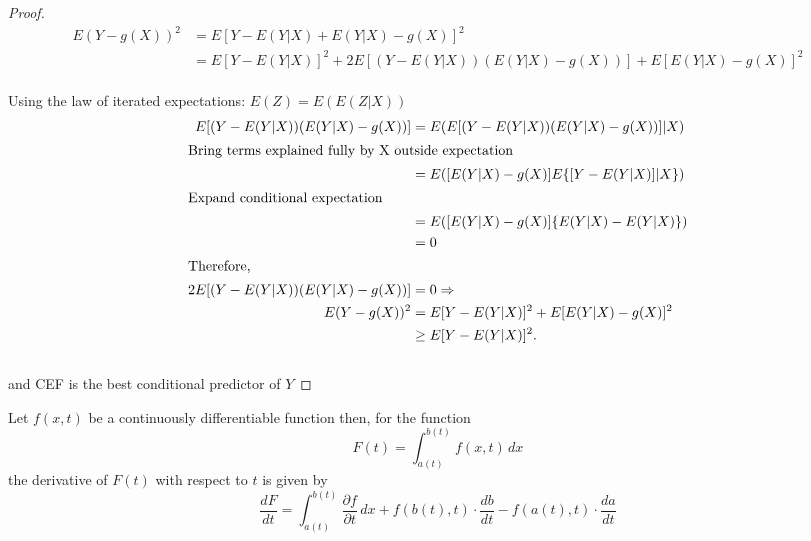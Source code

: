 \documentclass[DIV=14,titlepage=false]{scrreprt}
\begin{document}
\begin{proof}
  \begin{align*}
    E(Y - g(X))^2 &= E[Y - E(Y|X) + E(Y|X) - g(X)]^2 \\
    &= E[Y - E(Y|X)]^2 + 2E[(Y - E(Y|X))(E(Y|X) - g(X))] + E[E(Y|X) - g(X)]^2 
  \end{align*}\\
  Using the law of iterated expectations: $E(Z) = E(E(Z|X))$
  \begin{align*}
    E[(Y - E(Y|X))(E(Y|X) - g(X))] &= E(E[(Y - E(Y|X))(E(Y|X) - g(X))]|X) \\
    \intertext{Bring terms explained fully by X outside expectation}
    &= E([E(Y|X) - g(X)]E\{[Y - E(Y|X)]|X\}) \\
    \intertext{Expand conditional expectation}
    &= E([E(Y|X) - g(X)]\{E(Y|X) - E(Y|X)\}) \\
    &= 0 \\
    \intertext{Therefore,}
    2E[(Y - E(Y|X))(E(Y|X) - g(X))] &= 0 \implies\\
    E(Y - g(X))^2 &= E[Y - E(Y|X)]^2 + E[E(Y|X) - g(X)]^2 \\
    &\geq E[Y - E(Y|X)]^2.
  \end{align*}\\
    and CEF is the best conditional predictor of \( Y \)
\end{proof}

\begin{lemma}
  Let \( f(x, t) \) be a continuously differentiable function then, for the function
  \[  F(t) = \int_{a(t)}^{b(t)} f(x, t) \, dx  \]
  the derivative of \( F(t) \) with respect to \( t \) is given by
  \[  \frac{dF}{dt} = \int_{a(t)}^{b(t)} \frac{\partial f}{\partial t} \, dx + f(b(t), t) \cdot \frac{db}{dt} - f(a(t), t) \cdot \frac{da}{dt}  \]
\end{lemma}
\end{document}
